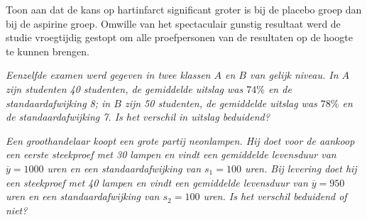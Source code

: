 {{\begin{opgave}
Toon aan dat de kans op hartinfarct significant groter is bij de placebo groep 
dan bij de aspirine groep. Omwille van het spectaculair gunstig resultaat werd 
de studie vroegtijdig gestopt om alle proefpersonen van de resultaten op de 
hoogte te kunnen brengen.
\end{opgave}

\begin{opgave}
\em Eenzelfde examen werd gegeven in twee klassen $A$ en $B$ van gelijk niveau. In $A$ zijn studenten 40 studenten, de gemiddelde uitslag was $74\%$ en de standaardafwijking 8; in $B$ zijn 50 studenten, de gemiddelde uitslag was $78\%$ en de standaardafwijking 7. Is het verschil in uitslag beduidend?
\end{opgave}
\begin{opgave}
\em Een groothandelaar koopt een grote partij neonlampen. Hij doet voor de aankoop een eerste steekproef met 30 lampen en vindt een gemiddelde levensduur van $\overline{y}=1000$ uren en een standaardafwijking van $s_1=100$ uren. Bij levering doet hij een steekproef met 40 lampen en vindt een gemiddelde levensduur van $\overline{y}=950$ uren en een standaardafwijking van $s_2=100$ uren. Is het verschil beduidend of niet?
\end{opgave}




}}
